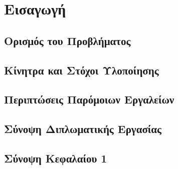 \chapter{Εισαγωγή}
\section{Ορισμός του Προβλήματος}

\section{Κίνητρα και Στόχοι Υλοποίησης}

\section{Περιπτώσεις Παρόμοιων Εργαλείων}

\section{Σύνοψη Διπλωματικής Εργασίας}

\section{Σύνοψη Κεφαλαίου 1}
